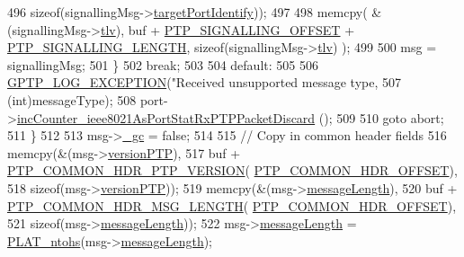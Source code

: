 \begin{DoxyCode}
{{{{{{{{496                    \textcolor{keyword}{sizeof}(signallingMsg->\hyperlink{class_p_t_p_message_signalling_a1d4353212906ed7366ffbf01cb56bdab}{targetPortIdentify}));
497 
498             memcpy( &(signallingMsg->\hyperlink{class_p_t_p_message_signalling_ab458dc952682abd8077ce12fbff3d1d6}{tlv}), buf + \hyperlink{avbts__message_8hpp_a3528ebe88df8c782038079cb1165d540}{PTP\_SIGNALLING\_OFFSET} + 
      \hyperlink{avbts__message_8hpp_ac728b0caa27d25b33564be179caa3ffd}{PTP\_SIGNALLING\_LENGTH}, \textcolor{keyword}{sizeof}(signallingMsg->\hyperlink{class_p_t_p_message_signalling_ab458dc952682abd8077ce12fbff3d1d6}{tlv}) );
499 
500             msg = signallingMsg;
501         \}
502         \textcolor{keywordflow}{break};
503 
504     \textcolor{keywordflow}{default}:
505 
506         \hyperlink{gptp__log_8hpp_a5c9d2f25d8d69eb2e585b35c72896357}{GPTP\_LOG\_EXCEPTION}(\textcolor{stringliteral}{"Received unsupported message type, %
507                     (\textcolor{keywordtype}{int})messageType);
508         port->\hyperlink{class_common_port_ab127287dc3c8d4bed5595b456ba4b17d}{incCounter\_ieee8021AsPortStatRxPTPPacketDiscard}
      ();
509 
510         \textcolor{keywordflow}{goto} abort;
511     \}
512 
513     msg->\hyperlink{class_p_t_p_message_common_a1b15d1687680708819ead19f82a970a9}{\_gc} = \textcolor{keyword}{false};
514 
515     \textcolor{comment}{// Copy in common header fields}
516     memcpy(&(msg->\hyperlink{class_p_t_p_message_common_aebd1e0693c6170ff1b08b2471db92a80}{versionPTP}),
517            buf + \hyperlink{avbts__message_8hpp_a4b78a578ef002737321ef5c6def6593e}{PTP\_COMMON\_HDR\_PTP\_VERSION}(
      \hyperlink{avbts__message_8hpp_a330dd502b6e19949d74c8f3a96dd5667}{PTP\_COMMON\_HDR\_OFFSET}),
518            \textcolor{keyword}{sizeof}(msg->\hyperlink{class_p_t_p_message_common_aebd1e0693c6170ff1b08b2471db92a80}{versionPTP}));
519     memcpy(&(msg->\hyperlink{class_p_t_p_message_common_a6c490faee54bca860c4d897aae50990f}{messageLength}),
520            buf + \hyperlink{avbts__message_8hpp_a6db27d50a88956a08a99f2eb7b020247}{PTP\_COMMON\_HDR\_MSG\_LENGTH}(
      \hyperlink{avbts__message_8hpp_a330dd502b6e19949d74c8f3a96dd5667}{PTP\_COMMON\_HDR\_OFFSET}),
521            \textcolor{keyword}{sizeof}(msg->\hyperlink{class_p_t_p_message_common_a6c490faee54bca860c4d897aae50990f}{messageLength}));
522     msg->\hyperlink{class_p_t_p_message_common_a6c490faee54bca860c4d897aae50990f}{messageLength} = \hyperlink{linux_2src_2platform_8cpp_a6b8f3e7b87b66fa774a07ddc67f883a7}{PLAT\_ntohs}(msg->\hyperlink{class_p_t_p_message_common_a6c490faee54bca860c4d897aae50990f}{messageLength});
}}}}}}}}}
\end{DoxyCode}
